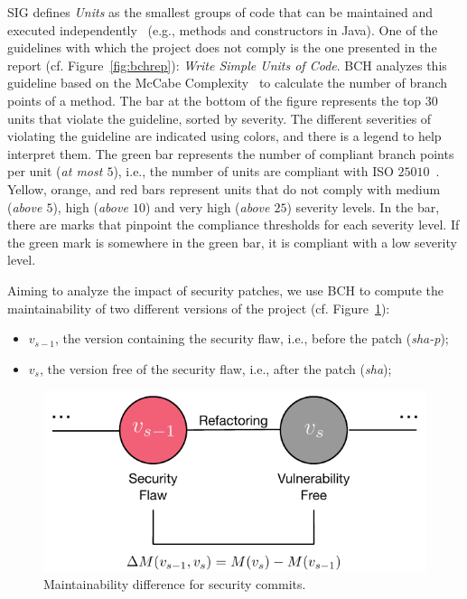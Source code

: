 \documentclass[smallextended]{svjour3}       %
\begin{document}
SIG defines \emph{Units} as the smallest groups of code that can be 
maintained and executed independently~\cite{Visser:2016:OREILLY} 
(e.g., methods and constructors in Java). One of the guidelines with 
which the project does not comply is the one presented in the report 
(cf. Figure~\ref{fig:bchrep}): \emph{Write Simple Units of Code}. BCH 
analyzes this guideline based on the McCabe 
Complexity~\cite{1702388} to calculate the number of branch points 
of a method. The bar at the bottom of the figure represents the top 
$30$ units that violate the guideline, sorted by severity. The 
different severities of violating the guideline are indicated using 
colors, and there is a legend to help interpret them. The green 
bar represents the number of compliant branch points per unit 
(\emph{at most $5$}), i.e., the number of units are compliant with 
ISO $25010$~\cite{iso:2011}. Yellow, orange, and red bars represent 
units that do not comply with medium (\emph{above $5$}), high 
(\emph{above $10$}) and very high (\emph{above $25$}) severity 
levels. In the bar, there are marks that pinpoint the compliance 
thresholds for each severity level. If the green mark is somewhere 
in the green bar, it is compliant with a low severity level.

Aiming to analyze the impact of security patches, we use BCH to compute 
the maintainability of two different versions of the project 
(cf. Figure~\ref{fig:commit}):

\begin{itemize}
	\item $v_{s-1}$, the version containing the security flaw, i.e., 
	before the patch (\emph{sha-p});
	\item $v_{s}$, the version free of the security flaw, i.e., 
	after the patch (\emph{sha});
\end{itemize}

\begin{figure}[h]
 	\centering 	
	\includegraphics[width=0.5\linewidth]{figures/commit.pdf}
 	\caption{Maintainability difference for security commits.}
	\label{fig:commit}
\end{figure}
\end{document}
